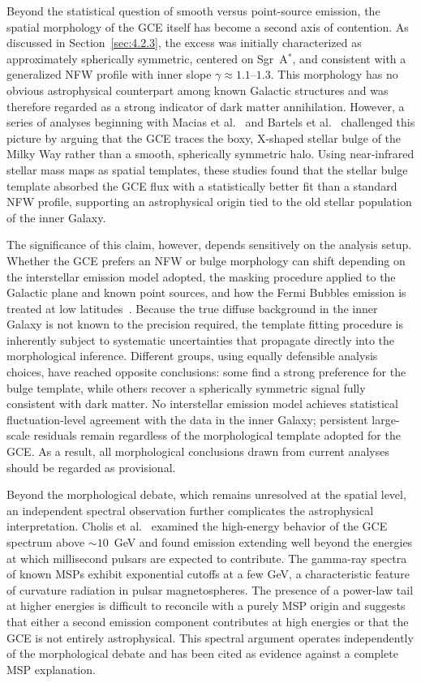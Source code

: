 Beyond the statistical question of smooth versus point-source emission, the spatial morphology of the GCE itself has become a second axis of contention.
As discussed in Section~\ref{sec:4.2.3}, the excess was initially characterized as approximately spherically symmetric, centered on Sgr~A$^*$, and consistent with a generalized NFW profile with inner slope $\gamma \approx 1.1$--$1.3$.
This morphology has no obvious astrophysical counterpart among known Galactic structures and was therefore regarded as a strong indicator of dark matter annihilation.
However, a series of analyses beginning with Macias et al.~\cite{Macias:2016nev,Macias:2019omb} and Bartels et al.~\cite{Bartels:2018xom} challenged this picture by arguing that the GCE traces the boxy, X-shaped stellar bulge of the Milky Way rather than a smooth, spherically symmetric halo.
Using near-infrared stellar mass maps as spatial templates, these studies found that the stellar bulge template absorbed the GCE flux with a statistically better fit than a standard NFW profile, supporting an astrophysical origin tied to the old stellar population of the inner Galaxy.

The significance of this claim, however, depends sensitively on the analysis setup.
Whether the GCE prefers an NFW or bulge morphology can shift depending on the interstellar emission model adopted, the masking procedure applied to the Galactic plane and known point sources, and how the Fermi Bubbles emission is treated at low latitudes~\cite{Cirelli:2024ssz}.
Because the true diffuse background in the inner Galaxy is not known to the precision required, the template fitting procedure is inherently subject to systematic uncertainties that propagate directly into the morphological inference.
Different groups, using equally defensible analysis choices, have reached opposite conclusions: some find a strong preference for the bulge template, while others recover a spherically symmetric signal fully consistent with dark matter.
No interstellar emission model achieves statistical fluctuation-level agreement with the data in the inner Galaxy; persistent large-scale residuals remain regardless of the morphological template adopted for the GCE.
As a result, all morphological conclusions drawn from current analyses should be regarded as provisional.

Beyond the morphological debate, which remains unresolved at the spatial level, an independent spectral observation further complicates the astrophysical interpretation.
Cholis et al.~\cite{Cholis:2021rpp} examined the high-energy behavior of the GCE spectrum above $\sim 10$~GeV and found emission extending well beyond the energies at which millisecond pulsars are expected to contribute.
The gamma-ray spectra of known MSPs exhibit exponential cutoffs at a few GeV, a characteristic feature of curvature radiation in pulsar magnetospheres.
The presence of a power-law tail at higher energies is difficult to reconcile with a purely MSP origin and suggests that either a second emission component contributes at high energies or that the GCE is not entirely astrophysical.
This spectral argument operates independently of the morphological debate and has been cited as evidence against a complete MSP explanation.

